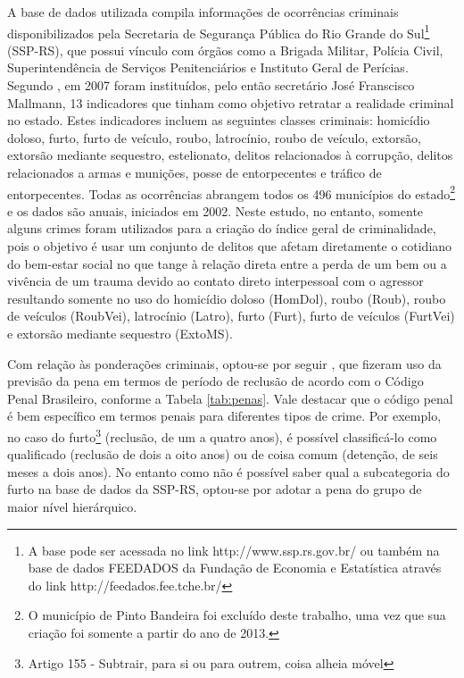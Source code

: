 \documentclass[12pt,openright,oneside,a4paper,english,french,spanish]{abntex2}
\numberwithin{table}{section} %
\numberwithin{figure}{section} %
\newcommand{\co}{\citeonline}
\begin{document}
A base de dados utilizada compila informações de ocorrências criminais disponibilizados pela Secretaria de Segurança Pública do Rio Grande do Sul\footnote{A base pode ser acessada no link http://www.ssp.rs.gov.br/ ou também na base de dados FEEDADOS da Fundação de Economia e Estatística através do link http://feedados.fee.tche.br/} (SSP-RS), que possui vínculo com órgãos como a Brigada Militar, Polícia Civil, Superintendência de Serviços Penitenciários e Instituto Geral de Perícias. Segundo \co{monteiro2009mono}, em 2007 foram instituídos, pelo então secretário José Franscisco Mallmann, 13 indicadores que tinham como objetivo retratar a realidade criminal no estado. Estes indicadores incluem as seguintes classes criminais: homicídio doloso, furto, furto de veículo, roubo, latrocínio, roubo de veículo, extorsão, extorsão mediante sequestro, estelionato, delitos relacionados à corrupção, delitos relacionados a armas e munições, posse de entorpecentes e tráfico de entorpecentes. Todas as ocorrências abrangem todos os 496 municípios do estado\footnote{O município de Pinto Bandeira foi excluído deste trabalho, uma vez que sua criação foi somente a partir do ano de 2013.} e os dados são anuais, iniciados em 2002. Neste estudo, no entanto, somente alguns crimes foram utilizados para a criação do índice geral de criminalidade, pois o objetivo é usar um conjunto de delitos que afetam diretamente o cotidiano do bem-estar social no que tange à relação direta entre a perda de um bem ou a vivência de um trauma devido ao contato direto interpessoal com o agressor resultando somente no uso do homicídio doloso (HomDol), roubo (Roub), roubo de veículos (RoubVei), latrocínio (Latro), furto (Furt), furto de veículos (FurtVei) e extorsão mediante sequestro (ExtoMS).

Com relação às ponderações criminais, optou-se por seguir \co{freitas2016xixeeg}, que fizeram uso da previsão da pena em termos de período de reclusão de acordo com o Código Penal Brasileiro, conforme a Tabela \ref{tab:penas}. Vale destacar que o código penal é bem específico em termos penais para diferentes tipos de crime. Por exemplo, no caso do furto\footnote{Artigo 155 - Subtrair, para si ou para outrem, coisa alheia móvel} (reclusão, de um a quatro anos), é possível classificá-lo como qualificado (reclusão de dois a oito anos) ou de coisa comum (detenção, de seis meses a dois anos). No entanto como não é possível saber qual a subcategoria do furto na base de dados da SSP-RS, optou-se por adotar a pena do grupo de maior nível hierárquico.
\end{document}
